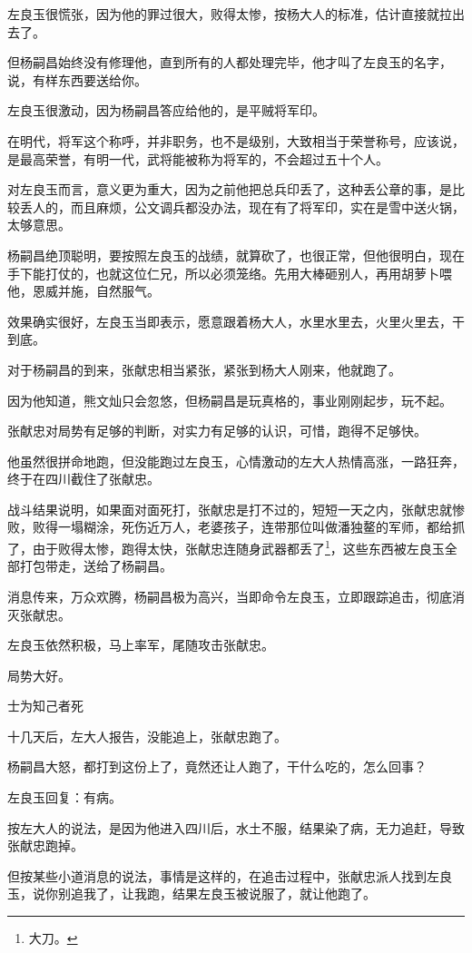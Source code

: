 \begin{multicols}{\theparacolNo}
左良玉很慌张，因为他的罪过很大，败得太惨，按杨大人的标准，估计直接就拉出去了。

但杨嗣昌始终没有修理他，直到所有的人都处理完毕，他才叫了左良玉的名字，说，有样东西要送给你。

左良玉很激动，因为杨嗣昌答应给他的，是平贼将军印。

在明代，将军这个称呼，并非职务，也不是级别，大致相当于荣誉称号，应该说，是最高荣誉，有明一代，武将能被称为将军的，不会超过五十个人。

对左良玉而言，意义更为重大，因为之前他把总兵印丢了，这种丢公章的事，是比较丢人的，而且麻烦，公文调兵都没办法，现在有了将军印，实在是雪中送火锅，太够意思。

杨嗣昌绝顶聪明，要按照左良玉的战绩，就算砍了，也很正常，但他很明白，现在手下能打仗的，也就这位仁兄，所以必须笼络。先用大棒砸别人，再用胡萝卜喂他，恩威并施，自然服气。

效果确实很好，左良玉当即表示，愿意跟着杨大人，水里水里去，火里火里去，干到底。

对于杨嗣昌的到来，张献忠相当紧张，紧张到杨大人刚来，他就跑了。

因为他知道，熊文灿只会忽悠，但杨嗣昌是玩真格的，事业刚刚起步，玩不起。

张献忠对局势有足够的判断，对实力有足够的认识，可惜，跑得不足够快。

他虽然很拼命地跑，但没能跑过左良玉，心情激动的左大人热情高涨，一路狂奔，终于在四川截住了张献忠。

战斗结果说明，如果面对面死打，张献忠是打不过的，短短一天之内，张献忠就惨败，败得一塌糊涂，死伤近万人，老婆孩子，连带那位叫做潘独鳌的军师，都给抓了，由于败得太惨，跑得太快，张献忠连随身武器都丢了\footnote{大刀。}，这些东西被左良玉全部打包带走，送给了杨嗣昌。

消息传来，万众欢腾，杨嗣昌极为高兴，当即命令左良玉，立即跟踪追击，彻底消灭张献忠。

左良玉依然积极，马上率军，尾随攻击张献忠。

局势大好。

士为知己者死

十几天后，左大人报告，没能追上，张献忠跑了。

杨嗣昌大怒，都打到这份上了，竟然还让人跑了，干什么吃的，怎么回事？

左良玉回复：有病。

按左大人的说法，是因为他进入四川后，水土不服，结果染了病，无力追赶，导致张献忠跑掉。

但按某些小道消息的说法，事情是这样的，在追击过程中，张献忠派人找到左良玉，说你别追我了，让我跑，结果左良玉被说服了，就让他跑了。


\end{multicols}

